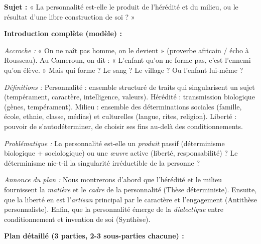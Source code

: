 \documentclass[11pt]{article}
\newcommand{\cle}[1]{{\popxbold\color{popdark}#1}}
\begin{document}
\begin{corrige}
\textbf{Sujet :} « La personnalité est-elle le produit de l'hérédité et du milieu, ou le résultat d'une libre construction de soi ? »

\textbf{Introduction complète (modèle) :}
\par \textit{Accroche :} « On ne naît pas homme, on le devient » (proverbe africain / écho à Rousseau). Au Cameroun, on dit : « L'enfant qu'on ne forme pas, c'est l'ennemi qu'on élève. » Mais qui forme ? Le sang ? Le village ? Ou l'enfant lui-même ?
\par \textit{Définitions :} \cle{Personnalité} : ensemble structuré de traits qui singularisent un sujet (tempérament, caractère, intelligence, valeurs). \cle{Hérédité} : transmission biologique (gènes, tempérament). \cle{Milieu} : ensemble des déterminations sociales (famille, école, ethnie, classe, médias) et culturelles (langue, rites, religion). \cle{Liberté} : pouvoir de s'autodéterminer, de choisir ses fins au-delà des conditionnements.
\par \textit{Problématique :} La personnalité est-elle un \emph{produit} passif (déterminisme biologique + sociologique) ou une \emph{œuvre} active (liberté, responsabilité) ? Le déterminisme nie-t-il la singularité irréductible de la personne ?
\par \textit{Annonce du plan :} Nous montrerons d'abord que l'hérédité et le milieu fournissent la \emph{matière} et le \emph{cadre} de la personnalité (Thèse déterministe). Ensuite, que la liberté en est l'\emph{artisan} principal par le caractère et l'engagement (Antithèse personnaliste). Enfin, que la personnalité émerge de la \emph{dialectique} entre conditionnement et invention de soi (Synthèse).

\textbf{Plan détaillé (3 parties, 2-3 sous-parties chacune) :}


\end{corrige}
\end{document}
